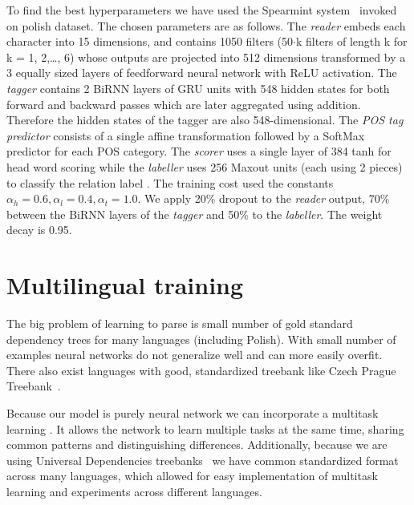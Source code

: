 \begin{sloppypar}
To find the best hyperparameters we have used the Spearmint system~\cite{snoek_practical_2012}
invoked on polish dataset. The chosen parameters are as follows.
The \emph{reader} embeds each character into 15 dimensions, and
contains 1050 filters (50$\cdot$k filters of length k for k = 1, 2,\dots, 6) 
whose outputs are projected into 512 dimensions transformed by a 3 equally
sized layers of feedforward neural network with ReLU activation.
The \emph{tagger} contains 2 BiRNN layers of GRU units with 548 hidden
states for both forward and backward passes which are later aggregated using
addition. Therefore the hidden states of the tagger are also 548-dimensional.
The \emph{POS tag predictor} consists of a single affine transformation
followed by a SoftMax predictor for each POS category.
The \emph{scorer} uses a single layer of 384 tanh for head word
scoring while the \emph{labeller} uses 256 Maxout units
(each using 2 pieces) to classify the relation label
\cite{goodfellow_maxout_2013}. The training cost used the constants
$\alpha_h=0.6, \alpha_l=0.4, \alpha_t=1.0$.
We apply 20\% dropout to the \emph{reader} output, 70\% between the BiRNN
layers of the \emph{tagger} and 50\% to the \emph{labeller}. The weight
decay is 0.95. %
\end{sloppypar}

\section{Multilingual training} \label{sec:neural_multilingual}
The big problem of learning to parse is small number of gold standard dependency
trees for many languages (including Polish). With small number of examples
neural networks do not generalize well and can more easily overfit.
There also exist languages with good, standardized treebank like Czech Prague
Treebank~\cite{prague_treebank}.

Because our model is purely neural network we can incorporate a multitask learning
\cite{caruana_multitask_learning}. It allows the network to learn multiple tasks
at the same time, sharing common patterns and distinguishing differences.
Additionally, because we are using Universal Dependencies treebanks~\cite{nivre_universal_2015}
we have common standardized format across many languages, which allowed for
easy implementation of multitask learning and experiments across different languages.

